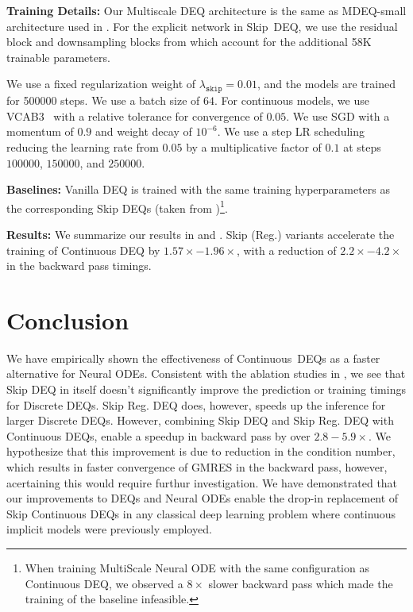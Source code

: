\textbf{Training Details:} Our Multiscale DEQ architecture is the same as MDEQ-small architecture used in \citet{bai_multiscale_2020}. For the explicit network in Skip~DEQ, we use the residual block and downsampling blocks from \citet{bai_multiscale_2020} which account for the additional 58K trainable parameters.

We use a fixed regularization weight of $\lambda_{\texttt{skip}} = 0.01$, and the models are trained for 500000 steps. We use a batch size of $64$. For continuous models, we use VCAB3~\citep{wanner1996solving} with a relative tolerance for convergence of $0.05$. We use SGD with a momentum of $0.9$ and weight decay of $10^{-6}$. We use a step LR scheduling reducing the learning rate from $0.05$ by a multiplicative factor of $0.1$ at steps $100000$, $150000$, and $250000$.

\textbf{Baselines:} Vanilla DEQ is trained with the same training hyperparameters as the corresponding Skip DEQs (taken from \citep{bai_multiscale_2020})\footnote{When training MultiScale Neural ODE with the same configuration as Continuous DEQ, we observed a $\mathit{8\times}$ slower backward pass which made the training of the baseline infeasible.}.

\textbf{Results:} We summarize our results in  and . Skip (Reg.) variants accelerate the training of Continuous DEQ by $\mathit{1.57\times - 1.96\times}$, with a reduction of $\mathit{2.2\times - 4.2\times}$ in the backward pass timings.


\section{Conclusion}
\label{sec:infinite_time_neural_odes_conclusion}

We have empirically shown the effectiveness of Continuous~DEQs as a faster alternative for Neural ODEs. Consistent with the ablation studies in \citet{bai2021neural}, we see that Skip DEQ in itself doesn't significantly improve the prediction or training timings for Discrete DEQs. Skip Reg. DEQ does, however, speeds up the inference for larger Discrete DEQs. However, combining Skip DEQ and Skip Reg. DEQ with Continuous DEQs, enable a speedup in backward pass by over $\mathit{2.8} - \mathit{5.9 \times}$. We hypothesize that this improvement is due to reduction in the condition number, which results in faster convergence of GMRES in the backward pass, however, acertaining this would require furthur investigation. We have demonstrated that our improvements to DEQs and Neural ODEs enable the drop-in replacement of Skip Continuous DEQs in any classical deep learning problem where continuous implicit models were previously employed.

